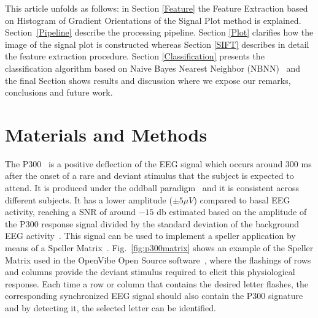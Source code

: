 \documentclass[entropy,article,submit,moreauthors,pdftex,10pt,a4paper]{mdpi}
\begin{document}
This article unfolds as follows: in Section \ref{Feature} the Feature Extraction based on Histogram of Gradient Orientations of the Signal Plot method is explained. Section~\ref{Pipeline} describe the processing pipeline.  Section \ref{Plot}  clarifies how the image of the signal plot is constructed whereas Section \ref{SIFT}  describes in detail the feature extraction procedure.  Section \ref{Classification}  presents the classification algorithm based on Naive Bayes Nearest Neighbor (NBNN)~\citep{Boiman2008} and the final Section shows results and discussion where we expose our remarks, conclusions and future work.

\section{Materials and Methods}

The P300~\citep{Farwell1988,Knuth2006} is a positive deflection of the EEG signal which occurs around $300$ ms after the onset of a rare and deviant stimulus that the subject is expected to attend.  It is produced under the oddball paradigm~\cite{WolpawJonathanR2012} and it is consistent across different subjects. It has a lower amplitude  ($\pm 5 \mu V $) compared to basal EEG activity, reaching a SNR of around $-15$ db estimated based on the amplitude of the P300 response signal divided by the standard deviation of the background EEG activity~\citep{Hu2010}.  This signal can be used to implement a speller application by means of a Speller Matrix~\citep{Farwell1988}. Fig.~\ref{fig:p300matrix} shows an example of the Speller Matrix used in the OpenVibe Open Source software~\citep{Renard2010}, where the flashings of rows and columns provide the deviant stimulus required to elicit this physiological response.   Each time a row or column that contains the desired letter flashes, the corresponding synchronized EEG signal should also contain the P300 signature and by detecting it, the selected letter can be identified.
\end{document}
